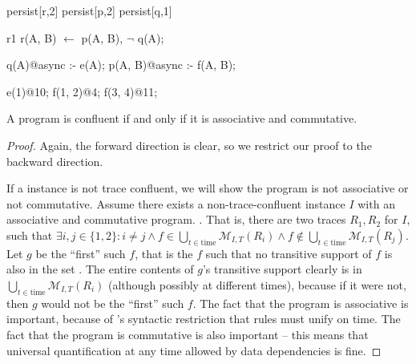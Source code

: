 \begin{Dedalus}
persist[r,2]
persist[p,2]
persist[q,1]

r1
r(A, B) \(\leftarrow\) 
    p(A, B), \(\lnot\) q(A);

q(A)@async :- e(A);
p(A, B)@async :- f(A, B);

e(1)@10;
f(1, 2)@4;
f(3, 4)@11; 
\end{Dedalus} 

\begin{lemma}
%
A \lang program is confluent if and only if it is associative and commutative.
%
\end{lemma}

\begin{proof}
%
Again, the forward direction is clear, so we restrict our proof to the
backward direction.

If a \lang instance is not trace confluent, we will show the \lang program is
not associative or not commutative.  Assume there exists a non-trace-confluent 
\lang instance $I$ with an associative and commutative program.  .  That is, there
are two traces $R_1, R_2$ for $I$, such that
$\exists i,j \in \{1,2\}: i \neq j \land f \in \bigcup_{t \in \text{time}}
\mathcal{M}_{I,T}(R_i) \land f \not\in \bigcup_{t \in \text{time}}
\mathcal{M}_{I,T}(R_j)$.  Let $g$ be the ``first'' such $f$, that is the $f$
such that no transitive support of $f$ is also in the set .  The entire contents of $g$'s transitive
support clearly is in $\bigcup_{t \in \text{time}} \mathcal{M}_{I,T}(R_i)$
 (although possibly at different times), because if it were not,
then $g$ would not be the ``first'' such $f$.  The fact that the program is
associative is important, because of \lang's syntactic restriction that rules
must unify on time.  The fact that the program is commutative is also important
-- this means that universal quantification at any time allowed by data
dependencies is fine.  
%
\end{proof}

